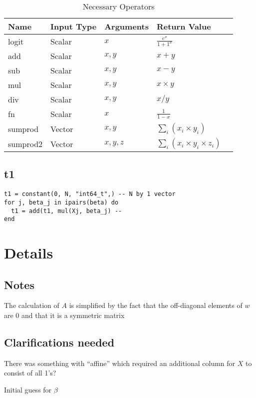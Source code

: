 \documentclass[12pt,timesnewroman,letterpaper]{article}
\begin{document}
\begin{table}[hb]
\centering
\begin{tabular}{|l|l|l|l|l|} \hline \hline
  {\bf Name} & {\bf Input Type} & {\bf Arguments} & {\bf Return Value} \\ \hline \hline
  logit & Scalar & \(x\) & \(\frac{e^x}{1 + 1^x}\) \\ \hline
  add & Scalar & \(x, y\) & \(x + y \)  \\ \hline
  sub & Scalar & \(x, y\) & \(x - y \)  \\ \hline
  mul & Scalar & \(x, y\) & \(x \times y \)  \\ \hline
  div & Scalar & \(x, y\) & \(x / y \)  \\ \hline
  fn & Scalar & \(x\) & \(\frac{1}{1 - x}\) \\ \hline
  sumprod & Vector & \(x, y\) & \(\sum_i (x_i \times y_i)\) \\ \hline
  sumprod2 & Vector & \(x, y, z\) & \(\sum_i (x_i \times y_i \times z_i)\) \\ \hline
\hline
\end{tabular}
\caption{Necessary Operators}
\label{tbl_custom_ops}
\end{table}

\subsection{t1}
\label{t1}

\begin{verbatim}
t1 = constant(0, N, "int64_t",) -- N by 1 vector 
for j, beta_j in ipairs(beta) do
  t1 = add(t1, mul(Xj, beta_j) -- 
end
\end{verbatim}

\section{Details}

\subsection{Notes}

\be
\item The calculation of \(A\) is simplified by the fact that the off-diagonal
  elements of \(w\) are 0 and that it is a symmetric matrix
\ee
\subsection{Clarifications needed}

\be
\item 
There was something with ``affine'' which required an additional column for
\(X\) to consist of all 1's? \TBC
\item Initial guess for \(\beta\)
\ee
\end{document}
